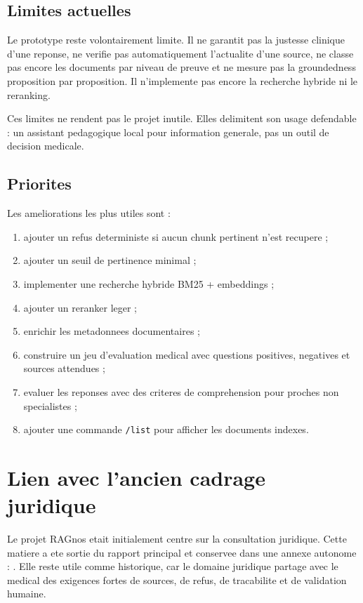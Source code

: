 \documentclass[11pt,a4paper]{article}
\begin{document}
\subsection{Limites actuelles}

Le prototype reste volontairement limite. Il ne garantit pas la justesse clinique d'une reponse, ne verifie pas automatiquement l'actualite d'une source, ne classe pas encore les documents par niveau de preuve et ne mesure pas la groundedness proposition par proposition. Il n'implemente pas encore la recherche hybride ni le reranking.

Ces limites ne rendent pas le projet inutile. Elles delimitent son usage defendable : un assistant pedagogique local pour information generale, pas un outil de decision medicale.

\subsection{Priorites}

Les ameliorations les plus utiles sont :

\begin{enumerate}
  \item ajouter un refus deterministe si aucun chunk pertinent n'est recupere ;
  \item ajouter un seuil de pertinence minimal ;
  \item implementer une recherche hybride BM25 + embeddings ;
  \item ajouter un reranker leger ;
  \item enrichir les metadonnees documentaires ;
  \item construire un jeu d'evaluation medical avec questions positives, negatives et sources attendues ;
  \item evaluer les reponses avec des criteres de comprehension pour proches non specialistes ;
  \item ajouter une commande \texttt{/list} pour afficher les documents indexes.
\end{enumerate}

\section{Lien avec l'ancien cadrage juridique}

Le projet RAGnos etait initialement centre sur la consultation juridique. Cette matiere a ete sortie du rapport principal et conservee dans une annexe autonome : . Elle reste utile comme historique, car le domaine juridique partage avec le medical des exigences fortes de sources, de refus, de tracabilite et de validation humaine.
\end{document}
